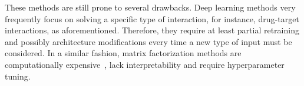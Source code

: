 \documentclass[sn-mathphys-num]{sn-jnl}%
\theoremstyle{thmstyleone}%
\theoremstyle{thmstyletwo}%
\theoremstyle{thmstylethree}%
\begin{document}
These methods are still prone to several drawbacks. Deep learning methods very frequently focus on solving a specific type of interaction, for instance, drug-target interactions, as aforementioned. Therefore, they require at least partial retraining and possibly architecture modifications
every time a new type of input must be considered.
In a similar fashion, matrix factorization methods are computationally expensive~\cite{vavasis_complexity_2010}, lack interpretability and require hyperparameter tuning. %

%
%
\end{document}
